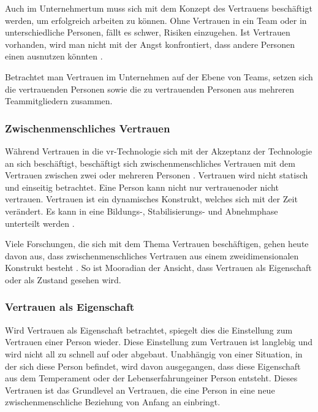 \documentclass[a4paper,11pt]{article}%
\renewcommand{\\}{\vspace*{0.5\baselineskip} \newline}
\begin{document}
Auch im Unternehmertum muss sich mit dem Konzept des Vertrauens beschäftigt werden, um erfolgreich arbeiten zu können. Ohne Vertrauen in ein Team oder in unterschiedliche Personen, fällt es schwer, Risiken einzugehen. Ist Vertrauen vorhanden, wird man nicht mit der Angst konfrontiert, dass andere Personen einen ausnutzen könnten \citep[p.1152]{breuer2016does}.

Betrachtet man Vertrauen im Unternehmen auf der Ebene von Teams, setzen sich die vertrauenden Personen sowie die zu vertrauenden Personen aus mehreren Teammitgliedern zusammen.
 

		\subsubsection{Zwischenmenschliches Vertrauen}
Während Vertrauen in die \ac{vr}-Technologie sich mit der Akzeptanz der Technologie an sich beschäftigt, beschäftigt sich zwischenmenschliches Vertrauen mit dem Vertrauen zwischen zwei oder mehreren Personen \citep{mcknight2011trust}.
Vertrauen wird nicht statisch und einseitig betrachtet. Eine Person kann nicht nur \dq vertrauen\dq oder \dq nicht vertrauen\dq. Vertrauen ist ein dynamisches Konstrukt, welches sich mit der Zeit verändert. Es kann in eine Bildungs-, Stabilisierungs- und Abnehmphase unterteilt werden \citep[p.396]{rousseau1998not}.

Viele Forschungen, die sich mit dem Thema Vertrauen beschäftigen, gehen heute davon aus, dass zwischenmenschliches Vertrauen aus einem zweidimensionalen Konstrukt besteht \citep{johnson2005cognitive} \citep{cook1980new}. So ist Mooradian \citep[p.524-525]{mooradian2006trusts} der Ansicht, dass Vertrauen als \dq{}Eigenschaft\dq{} oder als \dq{}Zustand\dq{} gesehen wird.

	\subsubsection{Vertrauen als Eigenschaft }

Wird Vertrauen als Eigenschaft betrachtet, spiegelt dies die Einstellung zum Vertrauen einer Person wieder. Diese Einstellung zum Vertrauen ist langlebig und wird nicht all zu schnell auf oder abgebaut. Unabhängig von einer Situation, in der sich diese Person befindet, wird davon ausgegangen, dass diese Eigenschaft aus dem Temperament oder der Lebenserfahrungeiner Person entsteht. Dieses Vertrauen ist das Grundlevel an Vertrauen, die eine Person in eine neue zwischenmenschliche Beziehung von Anfang an einbringt.
\end{document}
